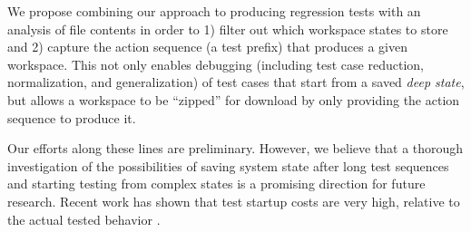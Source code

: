 We propose combining our approach to producing regression tests with an
analysis of file contents in order to 1) filter out which workspace states to
store and 2) capture the action sequence (a test prefix) that produces a given workspace.
This not only enables debugging (including test case reduction,
normalization, and generalization) of test cases that start from a
saved \emph{deep state}, but allows a workspace to be ``zipped'' for download by only
providing the action sequence to produce it.

Our efforts along these lines are preliminary.  However, we believe
that a thorough investigation of the possibilities of saving system
state after long test sequences and starting testing from complex
states is a promising direction for future research.  Recent work has
shown that test startup costs are very high, relative to the actual
tested behavior \cite{Bell}.